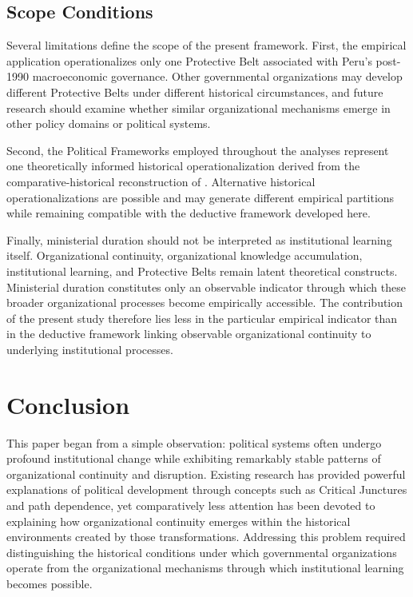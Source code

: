 \documentclass[doc, 12pt, a4paper,floatsintext]{apa7}
\begin{document}
\subsection{Scope Conditions}

Several limitations define the scope of the present framework. First, the empirical application operationalizes only one Protective Belt associated with Peru's post-1990 macroeconomic governance. Other governmental organizations may develop different Protective Belts under different historical circumstances, and future research should examine whether similar organizational mechanisms emerge in other policy domains or political systems.

Second, the Political Frameworks employed throughout the analyses represent one theoretically informed historical operationalization derived from the comparative-historical reconstruction of \textcite{lopez_jimenez_peru_2025}. Alternative historical operationalizations are possible and may generate different empirical partitions while remaining compatible with the deductive framework developed here.

Finally, ministerial duration should not be interpreted as institutional learning itself. Organizational continuity, organizational knowledge accumulation, institutional learning, and Protective Belts remain latent theoretical constructs. Ministerial duration constitutes only an observable indicator through which these broader organizational processes become empirically accessible. The contribution of the present study therefore lies less in the particular empirical indicator than in the deductive framework linking observable organizational continuity to underlying institutional processes.


\section{Conclusion}

This paper began from a simple observation: political systems often undergo profound institutional change while exhibiting remarkably stable patterns of organizational continuity and disruption. Existing research has provided powerful explanations of political development through concepts such as Critical Junctures and path dependence, yet comparatively less attention has been devoted to explaining how organizational continuity emerges within the historical environments created by those transformations. Addressing this problem required distinguishing the historical conditions under which governmental organizations operate from the organizational mechanisms through which institutional learning becomes possible.
\end{document}
